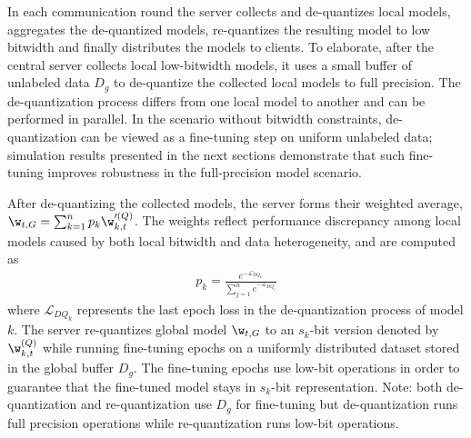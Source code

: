 In each communication round the server collects and de-quantizes local models, aggregates the de-quantized models, re-quantizes the resulting model to low bitwidth and finally distributes the models to clients. To elaborate, after the central server collects local low-bitwidth models, it uses a small buffer of unlabeled data $D_g$ to de-quantize the collected local models to full precision. The de-quantization process differs from one local model to another and can be performed in parallel. In the scenario without bitwidth constraints, de-quantization can be viewed as a fine-tuning step on uniform unlabeled data; simulation results presented in the next sections demonstrate that such fine-tuning improves robustness in the full-precision model scenario. 

After de-quantizing the collected models, the server forms their weighted average, $\w_{t, G} = \sum_{k=1}^n p_k \w'^{(Q)}_{k, t}$. The weights reflect performance discrepancy among local models caused by both local bitwidth and data heterogeneity, and are computed as 
\begin{align*}
    p_k = \frac{e^{-\mathcal{L}_{DQ_k}}}{\sum_{j=1}^n e^{-\mathcal{L}_{DQ_j}}}
\end{align*}
where $\mathcal{L}_{DQ_k}$ represents the last epoch loss in the de-quantization process of model $k$. 
The server re-quantizes global model $\w_{t, G}$ to an $s_k$-bit version denoted by $\w^{(Q)}_{k, t}$ while running fine-tuning epochs on a uniformly distributed dataset stored in the global buffer $D_g$. The fine-tuning epochs use low-bit operations in order to guarantee that the fine-tuned model stays in $s_k$-bit representation. Note: both de-quantization and re-quantization use $D_g$ for fine-tuning but de-quantization runs full precision operations while re-quantization runs low-bit operations.

